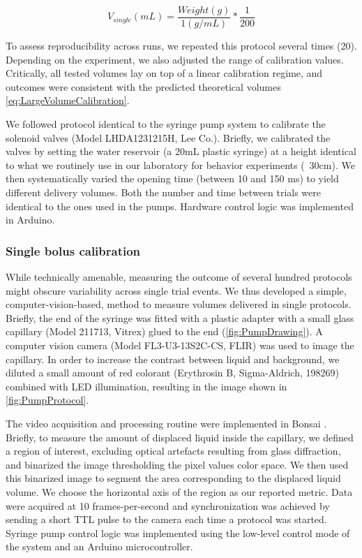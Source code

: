 \begin{equation} \label{eq:LargeVolumeCalibration}
    V_{single}(mL) = \frac{Weight (g)}{1 (g/mL)} * \frac{1}{200}
    \end{equation}

To assess reproducibility across runs, we repeated this protocol several times (20). Depending on the experiment, we also adjusted the range of calibration values. Critically, all tested volumes lay on top of a linear calibration regime, and outcomes were consistent with the predicted theoretical volumes \ref{eq:LargeVolumeCalibration}.

We followed protocol identical to the syringe pump system to calibrate the solenoid valves (Model LHDA1231215H, Lee Co.). Briefly, we calibrated the valves by setting the water reservoir (a 20mL plastic syringe) at a height identical to what we routinely use in our laboratory for behavior experiments (~30cm). We then systematically varied the opening time (between 10 and 150 ms) to yield different delivery volumes. Both the number and time between trials were identical to the ones used in the pumps. Hardware control logic was implemented in Arduino.

\subsubsection*{Single bolus calibration}

While technically amenable, measuring the outcome of several hundred protocols might obscure variability across single trial events. We thus developed a simple, computer-vision-based, method to measure volumes delivered in single protocols. Briefly, the end of the syringe was fitted with a plastic adapter with a small glass capillary (Model 211713, Vitrex) glued to the end (\ref{fig:PumpDrawing}). A computer vision camera (Model FL3-U3-13S2C-CS, FLIR) was used to image the capillary.
In order to increase the contrast between liquid and background, we diluted a small amount of red colorant (Erythrosin B, Sigma-Aldrich, 198269) combined with LED illumination, resulting in the image shown in \ref{fig:PumpProtocol}.

The video acquisition and processing routine were implemented in Bonsai . Briefly, to measure the amount of displaced liquid inside the capillary, we defined a region of interest, excluding optical artefacts resulting from glass diffraction, and binarized the image thresholding the pixel values color space. We then used this binarized image to segment the area corresponding to the displaced liquid volume. We choose the horizontal axis of the region as our reported metric. Data were acquired at 10 frames-per-second and synchronization was achieved by sending a short TTL pulse to the camera each time a protocol was started. Syringe pump control logic was implemented using the low-level control mode of the system and an Arduino microcontroller.

